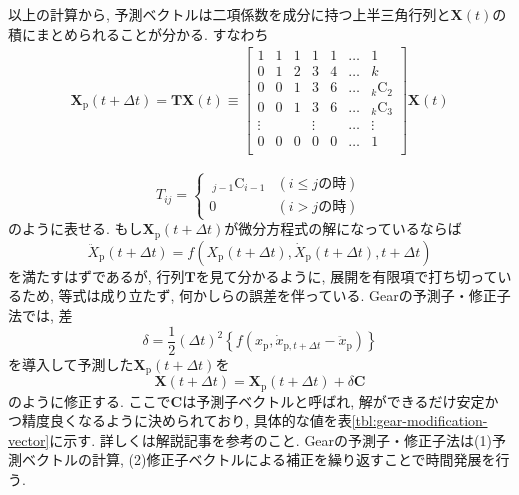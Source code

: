 以上の計算から, 予測ベクトルは二項係数を成分に持つ上半三角行列と$\bm{X}(t)$の積にまとめられることが分かる. すなわち
\begin{align}
  \bm{X}_{\mathrm{p}}(t + \Delta t)
  =
  \bm{T} \bm{X}(t)
  \equiv
  \begin{bmatrix}
    1 & 1 & 1 & 1 & 1 & \ldots & 1 \\
    0 & 1 & 2 & 3 & 4 & \ldots & k \\
    0 & 0 & 1 & 3 & 6 & \ldots & _k \mathrm{C}_{2} \\
    0 & 0 & 1 & 3 & 6 & \ldots & _k \mathrm{C}_{3} \\
    \vdots& & & \vdots& & \ldots & \vdots \\
    0 & 0 & 0 & 0 & 0 & \ldots & 1 \\
  \end{bmatrix}
  \bm{X}(t)
\end{align}

\begin{equation}
  T_{ij} =
  \begin{cases}
    ~_{j-1} \mathrm{C}_{i-1} & ( i \le j \mathrm{の時} )\\
    0                        & (i > j \mathrm{の時})
  \end{cases}
\end{equation}
のように表せる. もし$\bm{X}_{\mathrm{p}} (t + \Delta t)$が微分方程式の解になっているならば
\begin{equation}
  \ddot{X}_{\mathrm{p}} (t + \Delta t)
  =
  f(
    X_{\mathrm{p}} (t + \Delta t),
    \dot{X}_{\mathrm{p}} (t + \Delta t),
    t + \Delta t
  )
\end{equation}
を満たすはずであるが, 行列$\bm{T}$を見て分かるように, 展開を有限項で打ち切っているため, 等式は成り立たず, 何かしらの誤差を伴っている.
Gearの予測子・修正子法では, 差
\begin{equation}
  \delta
  =
  \frac{1}{2} (\Delta t)^{2}
  \left\{
    f(x_{\mathrm{p}}, \dot{x}_{\mathrm{p}, t+\Delta t} - \ddot{x}_{\mathrm{p}})
  \right\}
\end{equation}
を導入して予測した$\bm{X}_{\mathrm{p}}(t + \Delta t)$を
\begin{equation}
  \bm{X}(t + \Delta t)
  =
  \bm{X}_{\mathrm{p}} (t + \Delta t) + \delta \bm{C}
\end{equation}
のように修正する. ここで$\bm{C}$は予測子ベクトルと呼ばれ, 解ができるだけ安定かつ精度良くなるように決められており, 具体的な値を表\ref{tbl:gear-modification-vector}に示す. 詳しくは解説記事\cite{2003Nose}を参考のこと. Gearの予測子・修正子法は(1)予測ベクトルの計算, (2)修正子ベクトルによる補正を繰り返すことで時間発展を行う.

